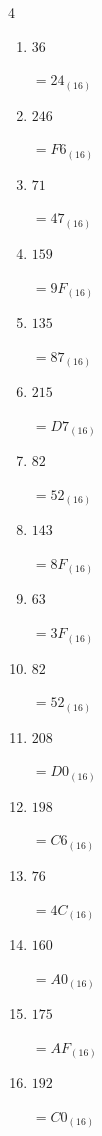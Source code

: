 \begin{multicols}{4}
\begin{enumerate}
        $=9A_{(16)}$

  \item $36$

        $=24_{(16)}$

  \item $246$

        $=F6_{(16)}$

  \item $71$

        $=47_{(16)}$

  \item $159$

        $=9F_{(16)}$

  \item $135$

        $=87_{(16)}$

  \item $215$

        $=D7_{(16)}$

  \item $82$

        $=52_{(16)}$

  \item $143$

        $=8F_{(16)}$

  \item $63$

        $=3F_{(16)}$

  \item $82$

        $=52_{(16)}$

  \item $208$

        $=D0_{(16)}$

  \item $198$

        $=C6_{(16)}$

  \item $76$

        $=4C_{(16)}$

\columnbreak %

  \item $160$

        $=A0_{(16)}$

  \item $175$

        $=AF_{(16)}$

  \item $192$

        $=C0_{(16)}$


\end{enumerate}
\end{multicols}

